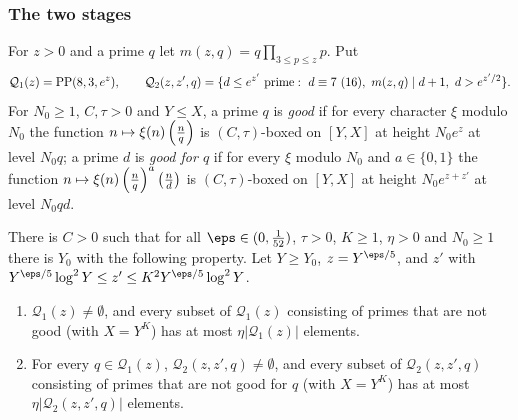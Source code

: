 \subsubsection{The two stages}

\begin{definition}\label{pf:top-supply:goodq}
For $z>0$ and a prime $q$ let $m(z,q)=q\prod_{3\le p\le z}p$. Put
\[
\mathcal Q_1(z)=\topsupplyPP(8,3,e^z),\qquad
\mathcal Q_2(z,z',q)=\{d\le e^{z'}\ \text{prime}:\ d\equiv7\ (16),\ m(z,q)\mid d+1,\ d>e^{z'/2}\}.
\]
For $N_0\ge1$, $C,\tau>0$ and $Y\le X$, a prime $q$ is \emph{good} if for every character $\xi$ modulo $N_0$ the function
$n\mapsto\xi(n)\left(\frac{n}{q}\right)$ is $(C,\tau)$-boxed on $[Y,X]$ at height $N_0e^z$ at level $N_0q$; a prime $d$ is
\emph{good for $q$} if for every $\xi$ modulo $N_0$ and $a\in\{0,1\}$ the function
$n\mapsto\xi(n)\left(\frac{n}{q}\right)^a\left(\frac{n}{d}\right)$ is $(C,\tau)$-boxed on $[Y,X]$ at height $N_0e^{z+z'}$ at level $N_0qd$.
 
  
\end{definition}

\begin{lemma}\label{pf:top-supply:stages}
There is $C>0$ such that for all $\eps\in(0,\frac1{52})$, $\tau>0$, $K\ge1$, $\eta>0$ and $N_0\ge1$ there is $Y_0$ with the
following property. Let $Y\ge Y_0$, $z=Y^{\eps/5}$, and $z'$ with $Y^{\eps/5}\log^2Y\le z'\le K^2Y^{\eps/5}\log^2Y$.
\begin{enumerate}[label=(\roman*)]
\item $\mathcal Q_1(z)\ne\emptyset$, and every subset of $\mathcal Q_1(z)$ consisting of primes that are not good (with
$X=Y^K$) has at most $\eta|\mathcal Q_1(z)|$ elements.
\item For every $q\in\mathcal Q_1(z)$, $\mathcal Q_2(z,z',q)\ne\emptyset$, and every subset of $\mathcal Q_2(z,z',q)$
consisting of primes that are not good for $q$ (with $X=Y^K$) has at most $\eta|\mathcal Q_2(z,z',q)|$ elements.
\end{enumerate}
  
\end{lemma}

